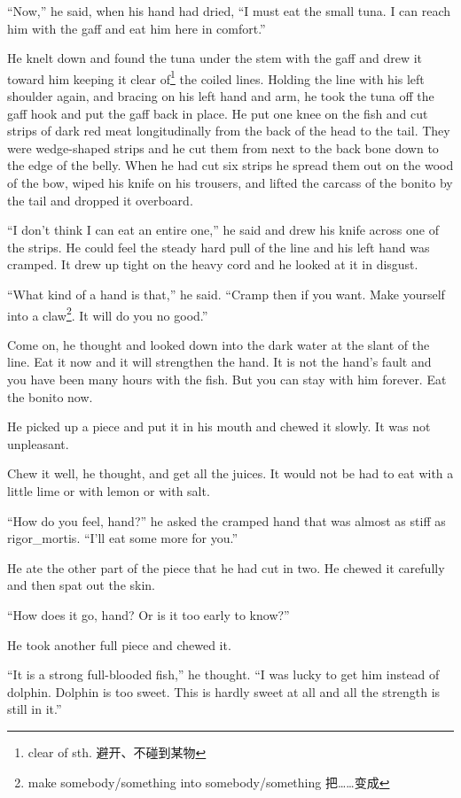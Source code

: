 \documentclass[fontset=ubuntu]{ctexrep}
\newlength{\drop}%
\begin{document}
``Now,'' he said, when his hand had dried, ``I must eat the small tuna. I
can reach him with the gaff and eat him here in comfort.''

He knelt down and found the tuna under the stem with the gaff and drew it
toward him keeping it clear of\footnote{clear of sth. 避开、不碰到某物} the
coiled lines. Holding the line with his left shoulder again, and bracing on
his left hand and arm, he took the tuna off the gaff hook and put the gaff
back in place. He put one knee on the fish and cut strips of dark red meat
\gls{longitudinally} from the back of the head to the tail. They were
\gls{wedge-shaped} strips and he cut them from next to the back bone down to the
edge of the belly. When he had cut six strips he spread them out on the wood
of the bow, \gls{wiped} his knife on his trousers, and lifted the \gls{carcass} of the
bonito by the tail and dropped it overboard.

``I don't think I can eat an \gls{entire} one,'' he said and drew his knife
across one of the strips. He could feel the steady hard pull of the line and
his left hand was cramped. It drew up tight on the heavy cord and he
looked at it in \gls{disgust}.

``What kind of a hand is that,'' he said. ``Cramp then if you want. Make
yourself into a \gls{claw}\footnote{make somebody/something into
  somebody/something 把……变成}. It will do you no good.''

Come on, he thought and looked down into the dark water at the slant of the
line. Eat it now and it will \gls{strengthen} the hand. It is not the hand's
fault and you have been many hours with the fish. But you can stay with him
forever. Eat the bonito now.

He picked up a piece and put it in his mouth and chewed it slowly. It was
not unpleasant.

Chew it well, he thought, and get all the juices. It would not be had to eat
with a little \gls{lime} or with lemon or with salt.

``How do you feel, hand?'' he asked the cramped hand that was almost as
stiff as \gls{rigor_mortis}. ``I'll eat some more for you.''

He ate the other part of the piece that he had cut in two. He chewed it
carefully and then spat out the skin.

``How does it go, hand? Or is it too early to know?''

He took another full piece and chewed it.

``It is a strong \gls{full-blooded} fish,'' he thought. ``I was lucky to get him
\gls{instead} of dolphin. Dolphin is too sweet. This is hardly sweet at all and
all the strength is still in it.''
\end{document}
